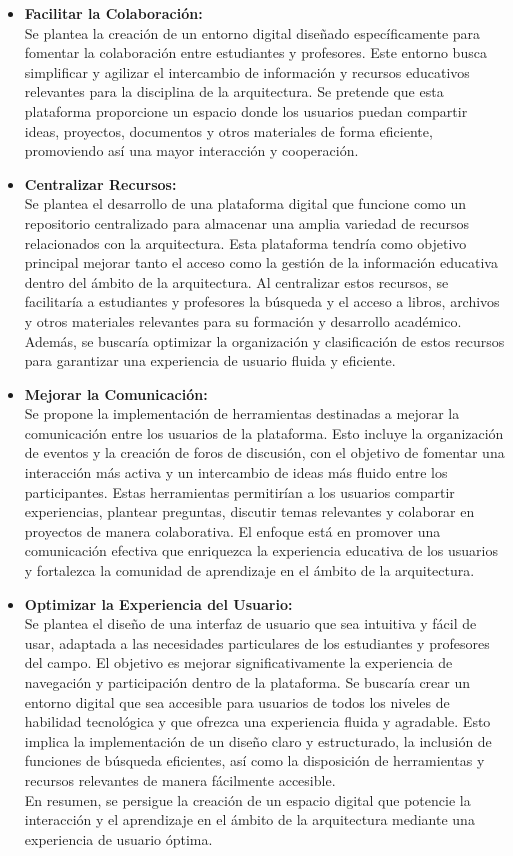 \documentclass[a4paper, 12pt]{book}
\begin{document}
\begin{itemize}
  \item \textbf{Facilitar la Colaboración: } \\ Se plantea la creación de un entorno digital diseñado específicamente para fomentar la colaboración entre estudiantes y profesores. Este entorno busca simplificar y agilizar el intercambio de información y recursos educativos relevantes para la disciplina de la arquitectura. Se pretende que esta plataforma proporcione un espacio donde los usuarios puedan compartir ideas, proyectos, documentos y otros materiales de forma eficiente, promoviendo así una mayor interacción y cooperación.
  \item \textbf{Centralizar Recursos: } \\ Se plantea el desarrollo de una plataforma digital que funcione como un repositorio centralizado para almacenar una amplia variedad de recursos relacionados con la arquitectura. Esta plataforma tendría como objetivo principal mejorar tanto el acceso como la gestión de la información educativa dentro del ámbito de la arquitectura. Al centralizar estos recursos, se facilitaría a estudiantes y profesores la búsqueda y el acceso a libros, archivos y otros materiales relevantes para su formación y desarrollo académico. Además, se buscaría optimizar la organización y clasificación de estos recursos para garantizar una experiencia de usuario fluida y eficiente.
  \item \textbf{Mejorar la Comunicación: } \\ Se propone la implementación de herramientas destinadas a mejorar la comunicación entre los usuarios de la plataforma. Esto incluye la organización de eventos y la creación de foros de discusión, con el objetivo de fomentar una interacción más activa y un intercambio de ideas más fluido entre los participantes. Estas herramientas permitirían a los usuarios compartir experiencias, plantear preguntas, discutir temas relevantes y colaborar en proyectos de manera colaborativa. El enfoque está en promover una comunicación efectiva que enriquezca la experiencia educativa de los usuarios y fortalezca la comunidad de aprendizaje en el ámbito de la arquitectura.
  \item \textbf{Optimizar la Experiencia del Usuario: } \\ Se plantea el diseño de una interfaz de usuario que sea intuitiva y fácil de usar, adaptada a las necesidades particulares de los estudiantes y profesores del campo. El objetivo es mejorar significativamente la experiencia de navegación y participación dentro de la plataforma. Se buscaría crear un entorno digital que sea accesible para usuarios de todos los niveles de habilidad tecnológica y que ofrezca una experiencia fluida y agradable. Esto implica la implementación de un diseño claro y estructurado, la inclusión de funciones de búsqueda eficientes, así como la disposición de herramientas y recursos relevantes de manera fácilmente accesible. \\ En resumen, se persigue la creación de un espacio digital que potencie la interacción y el aprendizaje en el ámbito de la arquitectura mediante una experiencia de usuario óptima.
\end{itemize}
\end{document}
